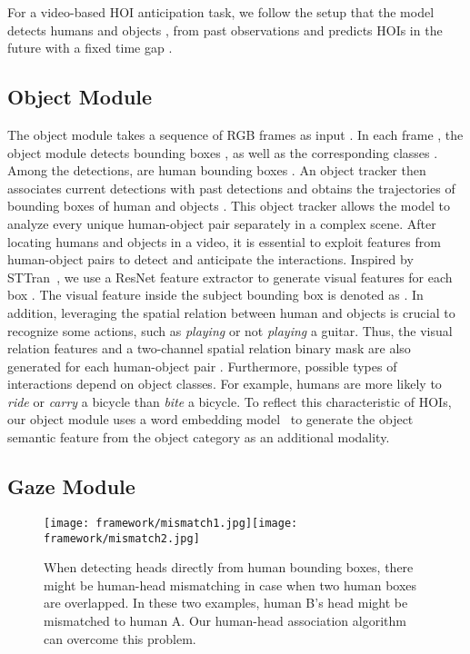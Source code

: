 \documentclass[times,twocolumn,final,authoryear]{elsarticle}
\begin{document}
For a video-based HOI anticipation task, we follow the setup that the model detects humans  and objects ,  from past observations  and predicts HOIs  in the future with a fixed time gap .

\subsection{Object Module}
The object module takes a sequence of  RGB frames as input . In each frame , the object module detects  bounding boxes , as well as the corresponding classes . Among the  detections,  are human bounding boxes . An object tracker then associates current detections with past detections and obtains the trajectories of bounding boxes of human  and objects . This object tracker allows the model to analyze every unique human-object pair separately in a complex scene. After locating humans and objects in a video, it is essential to exploit features from human-object pairs to detect and anticipate the interactions. Inspired by STTran~\citep{hoi_v2:sttran}, we use a ResNet feature extractor to generate visual features  for each box . The visual feature inside the subject bounding box  is denoted as . In addition, leveraging the spatial relation between human and objects is crucial to recognize some actions, such as \emph{playing} or not \emph{playing} a guitar. Thus, the visual relation features  and a two-channel spatial relation binary mask  are also generated for each human-object pair . Furthermore, possible types of interactions depend on object classes. For example, humans are more likely to \emph{ride} or \emph{carry} a bicycle than \emph{bite} a bicycle. To reflect this characteristic of HOIs, our object module uses a word embedding model~\citep{semantic:glove} to generate the object semantic feature  from the object category  as an additional modality. 

\subsection{Gaze Module}

\begin{figure}
    \centering
    \texttt{[image: framework/mismatch1.jpg]}\hspace{1em}\texttt{[image: framework/mismatch2.jpg]}
    \caption{When detecting heads directly from human bounding boxes, there might be human-head mismatching in case when two human boxes are overlapped. In these two examples, human B's head might be mismatched to human A. Our human-head association algorithm can overcome this problem.}
    \label{fig:mismatch}
\end{figure}
\end{document}
